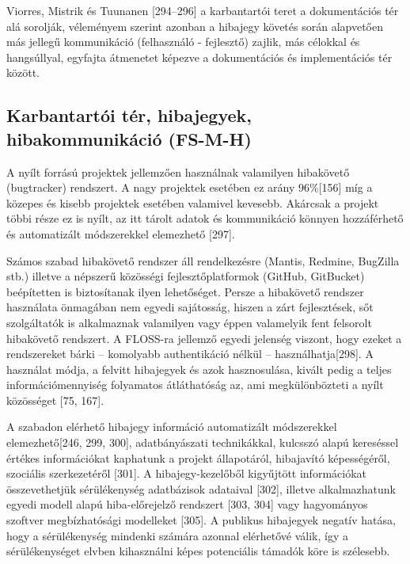 \documentclass[12pt,magyar,a4paper,oneside]{scrreprt}
\begin{document}
Viorres, Mistrik és Tuunanen {[}294--296{]} a karbantartói teret a
dokumentációs tér alá sorolják, véleményem szerint azonban a hibajegy
követés során alapvetően más jellegű kommunikáció (felhasználó -
fejlesztő) zajlik, más célokkal és hangsúllyal, egyfajta átmenetet
képezve a dokumentációs és implementációs tér között.

\hypertarget{sec:FS-M-H}{%
\subsection{Karbantartói tér, hibajegyek, hibakommunikáció
(FS-M-H)}\label{sec:FS-M-H}}

A nyílt forrású projektek jellemzően használnak valamilyen hibakövető
(bugtracker) rendszert. A nagy projektek esetében ez arány 96\%{[}156{]}
míg a közepes és kisebb projektek esetében valamivel kevesebb. Akárcsak
a projekt többi része ez is nyílt, az itt tárolt adatok és kommunikáció
könnyen hozzáférhető és automatizált módszerekkel elemezhető {[}297{]}.

Számos szabad hibakövető rendszer áll rendelkezésre (Mantis, Redmine,
BugZilla stb.) illetve a népszerű közösségi fejlesztőplatformok (GitHub,
GitBucket) beépítetten is biztosítanak ilyen lehetőséget. Persze a
hibakövető rendszer használata önmagában nem egyedi sajátosság, hiszen a
zárt fejlesztések, sőt szolgáltatók is alkalmaznak valamilyen vagy éppen
valamelyik fent felsorolt hibakövető rendszert. A FLOSS-ra jellemző
egyedi jelenség viszont, hogy ezeket a rendszereket bárki -- komolyabb
authentikáció nélkül -- használhatja{[}298{]}. A használat módja, a
felvitt hibajegyek és azok hasznosulása, kivált pedig a teljes
információmennyiség folyamatos átláthatóság az, ami megkülönbözteti a
nyílt közösséget {[}75, 167{]}.

A szabadon elérhető hibajegy információ automatizált módszerekkel
elemezhető{[}246, 299, 300{]}, adatbányászati technikákkal, kulcsszó
alapú kereséssel értékes információkat kaphatunk a projekt állapotáról,
hibajavító képességéről, szociális szerkezetéről {[}301{]}. A
hibajegy-kezelőből kigyűjtött információkat összevethetjük sérülékenység
adatbázisok adataival {[}302{]}, illetve alkalmazhatunk egyedi modell
alapú hiba-előrejelző rendszert {[}303, 304{]} vagy hagyományos szoftver
megbízhatósági modelleket {[}305{]}. A publikus hibajegyek negatív
hatása, hogy a sérülékenység mindenki számára azonnal elérhetővé válik,
így a sérülékenységet elvben kihasználni képes potenciális támadók köre
is szélesebb.
\end{document}
